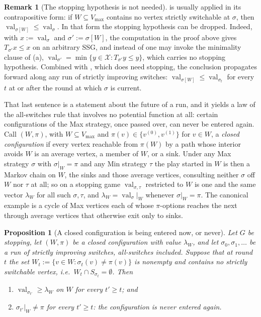 \documentclass[11pt]{article}
\theoremstyle{plain}
\newtheorem{proposition}[theorem]{Proposition}
\theoremstyle{definition}
\newtheorem{remark}[theorem]{Remark}
\DeclareMathOperator{\val}{val}
\newcommand{\Vmax}{V_{\max}}
\begin{document}
\begin{remark}[The stopping hypothesis is not needed]\label{rem:monotone-law-general}
 is usually applied in its contrapositive form: if
$W\subseteq\Vmax$ contains no vertex strictly switchable at $\sigma$, then
$\val_{\sigma[W]}\le\val_\sigma$. In that form the stopping hypothesis can
be dropped. Indeed, with $x:=\val_\sigma$ and $\sigma':=\sigma[W]$, the
computation in the proof above gives $T_{\sigma'}x\le x$ on an arbitrary
SSG, and instead of  one may invoke the minimality
clause of (a),
$\val_{\sigma'}=\min\{y\in\mathcal X:T_{\sigma'}y\le y\}$, which carries no
stopping hypothesis. Combined with , which does need
stopping, the conclusion propagates forward along any run of strictly
improving switches: $\val_{\sigma[W]}\le\val_{\sigma_t}$ for every $t$ at
or after the round at which $\sigma$ is current.
\end{remark}

That last sentence is a statement about the future of a run, and it yields
a law of the all-switches rule that involves no potential function at all:
certain configurations of the Max strategy, once passed over, can never be
entered again. Call $(W,\pi)$, with $W\subseteq\Vmax$ and
$\pi(v)\in\{v^{(0)},v^{(1)}\}$ for $v\in W$, a \emph{closed configuration}
if every vertex reachable from $\pi(W)$ by a path whose interior avoids
$W$ is an average vertex, a member of $W$, or a sink. Under any Max strategy $\sigma$ with
$\sigma|_W=\pi$ and any Min strategy $\tau$ the play started in $W$ is then
a Markov chain on $W$, the sinks and those average vertices, consulting
neither $\sigma$ off $W$ nor $\tau$ at all; so on a stopping game
$\val_{\sigma,\tau}$ restricted to $W$ is one and the same vector
$\lambda_W$ for all such $\sigma,\tau$, and $\lambda_W=\val_\sigma|_W$
whenever $\sigma|_W=\pi$. The canonical example is a cycle of Max vertices
each of whose $\pi$-options reaches the next through average vertices that
otherwise exit only to sinks.

\begin{proposition}[A closed configuration is being entered now, or
never]\label{prop:closed-now-or-never}
Let $G$ be stopping, let $(W,\pi)$ be a closed configuration with value
$\lambda_W$, and let $\sigma_0,\sigma_1,\dots$ be a run of strictly
improving switches, all-switches included. Suppose that at round $t$ the
set $W_t:=\{v\in W:\sigma_t(v)\ne\pi(v)\}$ is nonempty and contains no
strictly switchable vertex, i.e.\ $W_t\cap S_{\sigma_t}=\emptyset$. Then
\begin{enumerate}[label=(\alph*),leftmargin=2.2em]
\item $\val_{\sigma_{t'}}\ge\lambda_W$ on $W$ for every $t'\ge t$; and
\item $\sigma_{t'}|_W\ne\pi$ for every $t'\ge t$: the configuration is
      never entered again.
\end{enumerate}
\end{proposition}
\end{document}
